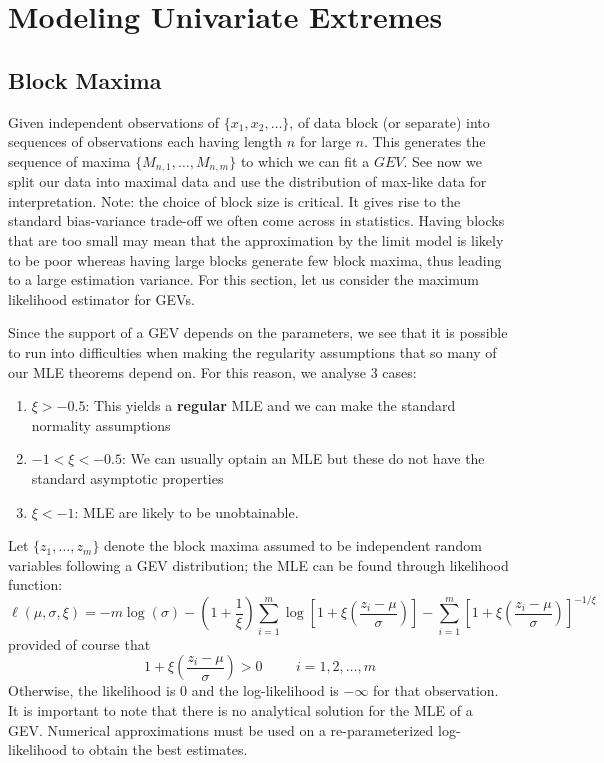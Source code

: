 \documentclass{article}
\theoremstyle{definition}
\theoremstyle{definition}
\def\l{\ell}
\begin{document}
\section{Modeling Univariate Extremes}
\subsection{Block Maxima}
Given independent observations of $\{x_1,x_2,\hdots\}$, of data block (or separate) into sequences of observations each having length $n$ for large $n$. This generates the sequence of maxima $\{M_{n,1},\hdots,M_{n,m}\}$ to which we can fit a $GEV$. See now we split our data into maximal data and use the distribution of max-like data for interpretation. Note: the choice of block size is critical. It gives rise to the standard bias-variance trade-off we often come across in statistics. Having blocks that are too small may mean that the approximation by the limit model is likely to be poor whereas having large blocks generate few block maxima, thus leading to a large estimation variance. For this section, let us consider the maximum likelihood estimator for GEVs.

Since the support of a GEV depends on the parameters, we see that it is possible to run into difficulties when making the regularity assumptions that so many of our MLE theorems depend on. For this reason, we analyse 3 cases:
\begin{enumerate}
    \item $\xi>-0.5$: This yields a \textbf{regular} MLE and we can make the standard normality assumptions
    \item $-1<\xi<-0.5$: We can usually optain an MLE but these do not have the standard asymptotic properties
    \item $\xi<-1$: MLE are likely to be unobtainable.
\end{enumerate}

Let $\{z_1,\hdots,z_m\}$ denote the block maxima assumed to be independent random variables following a GEV distribution; the MLE can be found through likelihood function:
\[\l(\mu,\sigma,\xi)=-m\log(\sigma)-(1+\frac{1}{\xi})\sum_{i=1}^m \log[1+\xi(\frac{z_i-\mu}{\sigma})]- \sum_{i=1}^m[1+\xi(\frac{z_i-\mu}{\sigma})]^{-1/\xi}\]
provided of course that \[1+\xi(\frac{z_i-\mu}{\sigma})>0\hspace{1cm}  i=1,2,\hdots,m\]
Otherwise, the likelihood is 0 and the log-likelihood is $-\infty$ for that observation. It is important to note that there is no analytical solution for the MLE of a GEV. Numerical approximations must be used 
on a re-parameterized log-likelihood to obtain the best estimates.
\end{document}
